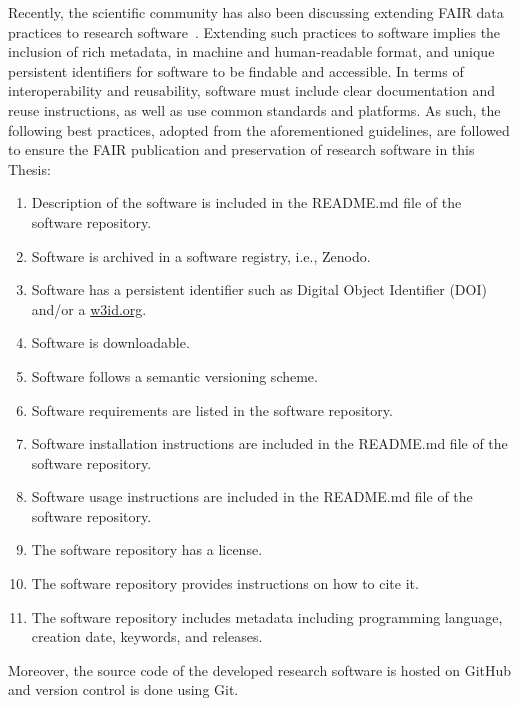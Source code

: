 Recently, the scientific community has also been discussing extending FAIR data practices to research software~\citep{martinez_top_2019,gruenpeter_d44_2024}.
Extending such practices to software implies the inclusion of rich metadata, in machine and human-readable format, and unique persistent identifiers for software to be findable and accessible.
In terms of interoperability and reusability, software must include clear documentation and reuse instructions, as well as use common standards and platforms.
As such, the following best practices, adopted from the aforementioned guidelines, are followed to ensure the FAIR publication and preservation of research software in this Thesis:

\begin{enumerate}
    \item Description of the software is included in the README.md file of the software repository. 
    \item Software is archived in a software registry, i.e., Zenodo.
    \item Software has a persistent identifier such as Digital Object Identifier (DOI) and/or a \url{w3id.org}.
    \item Software is downloadable.
    \item Software follows a semantic versioning scheme.
    \item Software requirements are listed in the software repository.
    \item Software installation instructions are included in the README.md file of the software repository.
    \item Software usage instructions are included in the README.md file of the software repository.
    \item The software repository has a license.
    \item The software repository provides instructions on how to cite it.
    \item The software repository includes metadata including programming language, creation date, keywords, and releases.
\end{enumerate}

Moreover, the source code of the developed research software is hosted on GitHub and version control is done using Git.